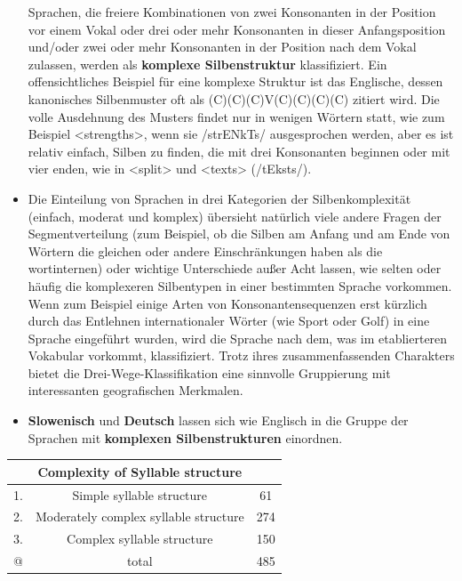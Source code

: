 \documentclass[
]{article}
\begin{document}
\begin{itemize}
  Sprachen, die freiere Kombinationen von zwei Konsonanten in der
  Position vor einem Vokal oder drei oder mehr Konsonanten in dieser
  Anfangsposition und/oder zwei oder mehr Konsonanten in der Position
  nach dem Vokal zulassen, werden als \textbf{komplexe Silbenstruktur}
  klassifiziert. Ein offensichtliches Beispiel für eine komplexe
  Struktur ist das Englische, dessen kanonisches Silbenmuster oft als
  (C)(C)(C)V(C)(C)(C)(C) zitiert wird. Die volle Ausdehnung des
  Musters findet nur in wenigen Wörtern statt, wie zum Beispiel
  \textless strengths\textgreater, wenn sie /strENkTs/ ausgesprochen werden, aber es ist
  relativ einfach, Silben zu finden, die mit drei Konsonanten beginnen
  oder mit vier enden, wie in \textless split\textgreater{} und \textless texts\textgreater{} (/tEksts/).
\item
  Die Einteilung von Sprachen in drei Kategorien der Silbenkomplexität
  (einfach, moderat und komplex) übersieht natürlich viele andere
  Fragen der Segmentverteilung (zum Beispiel, ob die Silben am Anfang
  und am Ende von Wörtern die gleichen oder andere Einschränkungen
  haben als die wortinternen) oder wichtige Unterschiede außer Acht
  lassen, wie selten oder häufig die komplexeren Silbentypen in einer
  bestimmten Sprache vorkommen. Wenn zum Beispiel einige Arten von
  Konsonantensequenzen erst kürzlich durch das Entlehnen
  internationaler Wörter (wie Sport oder Golf) in eine Sprache
  eingeführt wurden, wird die Sprache nach dem, was im etablierteren
  Vokabular vorkommt, klassifiziert. Trotz ihres zusammenfassenden
  Charakters bietet die Drei-Wege-Klassifikation eine sinnvolle
  Gruppierung mit interessanten geografischen Merkmalen.
\item
  \textbf{Slowenisch} und \textbf{Deutsch} lassen sich wie Englisch in die
  Gruppe der Sprachen mit \textbf{komplexen Silbenstrukturen} einordnen.
\end{itemize}

\begin{longtable}[]{@{}ccc@{}}
\toprule
~ & \textbf{Complexity of Syllable structure} & ~ \\
\midrule
\endhead
1. & Simple syllable structure & 61 \\
2. & Moderately complex syllable structure & 274 \\
3. & Complex syllable structure & 150 \\
@ & total & 485 \\
\bottomrule
\end{longtable}
\end{document}
